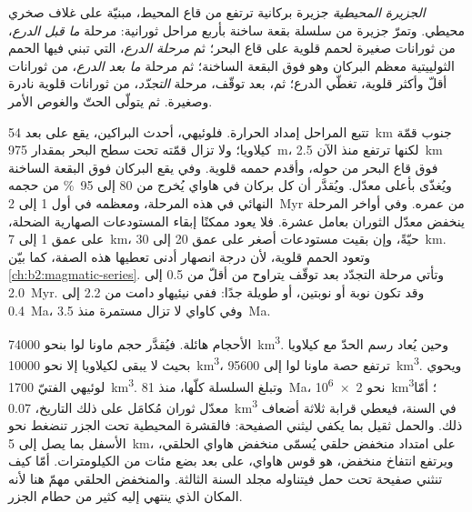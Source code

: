 \begin{definition}\label{def:b2:oceanic-islands:stages}
\emph{الجزيرة المحيطية} جزيرة بركانية ترتفع من قاع
المحيط، مبنيّة على غلاف صخري محيطي. وتمرّ جزيرة من سلسلة بقعة ساخنة بأربع مراحل
ثورانية: مرحلة \emph{ما قبل الدرع}، من ثورانات صغيرة لحمم قلوية على قاع البحر؛ ثم
\emph{مرحلة الدرع}، التي تبني فيها الحمم الثولييتية معظم البركان
وهو فوق البقعة الساخنة؛ ثم مرحلة \emph{ما بعد الدرع}، من ثورانات أقلّ وأكثر قلوية،
تغطّي الدرع؛ ثم، بعد توقّف، مرحلة \emph{التجدّد}، من ثورانات قلوية نادرة
وصغيرة. ثم يتولّى الحتّ والغوص الأمر.
\end{definition}

تتبع المراحل إمداد الحرارة. فلوئيهي، أحدث البراكين، يقع على بعد \qty{54}{km} جنوب
قمّة كيلاويا؛ ولا تزال قمّته تحت سطح البحر بمقدار \qty{975}{m}، لكنها ترتفع منذ الآن \qty{2.5}{km}
فوق قاع البحر من حوله، وأقدم حممه قلوية. وفي  يقع البركان فوق
البقعة الساخنة ويُغذّى بأعلى معدّل. ويُقدَّر أن كل بركان في هاواي يُخرج من 80 إلى
\qty{95}{\percent} من حجمه النهائي في هذه المرحلة، ومعظمه في أول 1 إلى \qty{2}{Myr} من عمره.
وفي أواخر المرحلة ينخفض معدّل الثوران بعامل عشرة. فلا يعود ممكنًا إبقاء المستودعات الصهارية
الضحلة، على عمق 1 إلى \qty{7}{km}، حيّةً، وإن بقيت مستودعات أصغر على عمق 20 إلى \qty{30}{km}.
وتعود الحمم قلوية، لأن درجة انصهار أدنى تعطيها هذه الصفة، كما
بيّن \cref{ch:b2:magmatic-series}. وتأتي مرحلة التجدّد بعد توقّف يتراوح من أقلّ من 0.5
إلى \qty{2.0}{Myr}. وقد تكون نوبة أو نوبتين، أو طويلة جدًا: ففي نيئيهاو دامت من 2.2 إلى
\qty{0.4}{Ma}، وفي كاواي لا تزال مستمرة منذ \qty{3.5}{Ma}.

الأحجام هائلة. فيُقدَّر حجم ماونا لوا بنحو \qty{74000}{km^3}. وحين يُعاد رسم الحدّ مع
كيلاويا بحيث لا يبقى لكيلاويا إلا نحو \qty{10000}{km^3}، ترتفع حصة ماونا لوا إلى
\qty{95600}{km^3}. ويحوي لوئيهي الفتيّ \qty{1700}{km^3}. وتبلغ السلسلة كلّها، منذ
\qty{81}{Ma}، نحو \qty{2e6}{km^3}؛ أمّا معدّل ثوران مُكامَل على ذلك التاريخ، \qty{0.07}{km^3}
في السنة، فيعطي قرابة ثلاثة أضعاف ذلك. والحمل ثقيل بما يكفي ليثني الصفيحة: فالقشرة
المحيطية تحت الجزر تنضغط نحو الأسفل بما يصل إلى \qty{5}{km}، على امتداد منخفض حلقي يُسمّى
منخفض هاواي الحلقي، ويرتفع انتفاخ منخفض، هو قوس هاواي، على بعد بضع مئات من الكيلومترات. أمّا
كيف تنثني صفيحة تحت حمل فيتناوله مجلد السنة الثالثة. والمنخفض الحلقي مهمّ هنا لأنه المكان الذي ينتهي إليه كثير من حطام الجزر.

